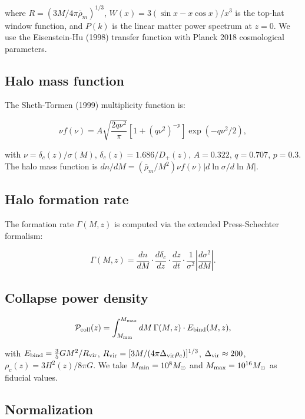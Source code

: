 \documentclass[aps,prd,onecolumn]{revtex4-2}
\begin{document}
where $R = (3M/4\pi\bar{\rho}_m)^{1/3}$, $W(x) = 3(\sin x - x\cos x)/x^3$ is the top-hat window function, and $P(k)$ is the linear matter power spectrum at $z=0$. We use the Eisenstein-Hu (1998) transfer function with Planck 2018 cosmological parameters.

\subsection{Halo mass function}

The Sheth-Tormen (1999) multiplicity function is:

\begin{equation}
\nu f(\nu) = A\sqrt{\frac{2q\nu^2}{\pi}}\left[1 + (q\nu^2)^{-p}\right]\exp(-q\nu^2/2),
\end{equation}

with $\nu = \delta_c(z)/\sigma(M)$, $\delta_c(z) = 1.686/D_+(z)$, $A = 0.322$, $q = 0.707$, $p = 0.3$. The halo mass function is $dn/dM = (\bar{\rho}_m/M^2) \nu f(\nu) |d\ln\sigma/d\ln M|$.

\subsection{Halo formation rate}

The formation rate $\Gamma(M,z)$ is computed via the extended Press-Schechter formalism:

\begin{equation}
\Gamma(M,z) = \frac{dn}{dM} \cdot \frac{d\delta_c}{dz} \cdot \frac{dz}{dt} \cdot \frac{1}{\sigma^2}\left|\frac{d\sigma^2}{dM}\right|.
\end{equation}

\subsection{Collapse power density}

\begin{equation}
\mathcal{P}_{\rm coll}(z) = \int_{M_{\rm min}}^{M_{\rm max}} dM \, \Gamma(M,z) \cdot E_{\rm bind}(M,z),
\end{equation}

with $E_{\rm bind} = \frac{3}{5}GM^2/R_{\rm vir}$, $R_{\rm vir} = [3M/(4\pi\Delta_{\rm vir}\rho_c)]^{1/3}$, $\Delta_{\rm vir} \approx 200$, $\rho_c(z) = 3H^2(z)/8\pi G$. We take $M_{\rm min} = 10^8 M_\odot$ and $M_{\rm max} = 10^{16} M_\odot$ as fiducial values.

\subsection{Normalization}
\end{document}
